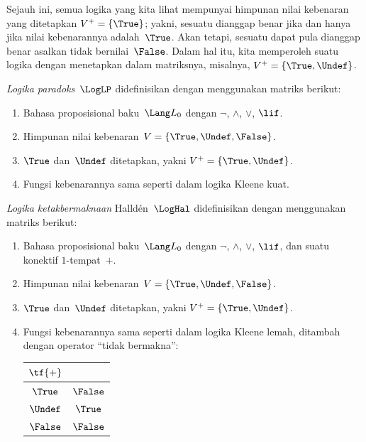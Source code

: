 \documentclass[../../../include/open-logic-section]{subfiles}
\begin{document}


Sejauh ini, semua logika yang kita lihat mempunyai himpunan nilai kebenaran
yang ditetapkan $V^+=\{\True\}$; yakni, sesuatu dianggap benar jika dan hanya
jika nilai kebenarannya adalah~$\True$. Akan tetapi, sesuatu dapat pula
dianggap benar asalkan tidak bernilai~$\False$. Dalam hal itu, kita memperoleh
suatu logika dengan menetapkan dalam matriksnya, misalnya,
$V^+=\{\True,\Undef\}$.

\begin{defn}
\emph{Logika paradoks}~$\LogLP$ didefinisikan dengan menggunakan matriks
berikut:
\begin{enumerate}
  \item Bahasa proposisional baku~$\Lang L_0$ dengan $\lnot$, $\land$,
  $\lor$, $\lif$.
  \item Himpunan nilai kebenaran~$V=\{\True,\Undef,\False\}$.
  \item $\True$ dan~$\Undef$ ditetapkan, yakni
  $V^+=\{\True,\Undef\}$.
  \item Fungsi kebenarannya sama seperti dalam logika Kleene kuat.
\end{enumerate}
\end{defn}

\begin{defn}
\emph{Logika ketakbermaknaan} Halld\'en~$\LogHal$ didefinisikan dengan
menggunakan matriks berikut:
\begin{enumerate}
  \item Bahasa proposisional baku~$\Lang L_0$ dengan $\lnot$, $\land$,
  $\lor$, $\lif$, dan suatu konektif $1$-tempat~$+$.
  \item Himpunan nilai kebenaran~$V=\{\True,\Undef,\False\}$.
  \item $\True$ dan~$\Undef$ ditetapkan, yakni
  $V^+=\{\True,\Undef\}$.
  \item Fungsi kebenarannya sama seperti dalam logika Kleene lemah, ditambah
  dengan operator ``tidak bermakna'':
  \begin{center}
    \begin{tabular}{c|c}
    $\tf{+}$ & \\
    \hline
    $\True$ & $\False$ \\
    $\Undef$ & $\True$ \\
    $\False$ & $\False$
    \end{tabular}
  \end{center}
\end{enumerate}
\end{defn}
\end{document}
